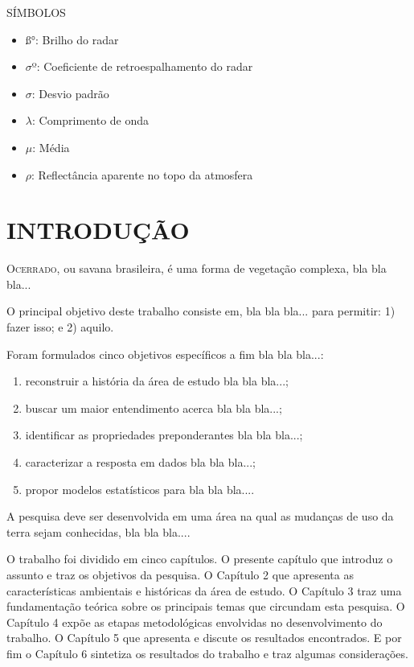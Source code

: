 \documentclass[
    oneside,
    a4paper,
    12pt
]{book}
\begin{document}
SÍMBOLOS
\begin{itemize}
    \item ß°: Brilho do radar
    \item {$\sigma$}º: Coeficiente de retroespalhamento do radar
    \item $\sigma$: Desvio padrão
    \item $\lambda$: Comprimento de onda
    \item $\mu$: Média
    \item {$\rho$}: Reflectância aparente no topo da atmosfera

\end{itemize}

\mainmatter    %
\chapter{INTRODUÇÃO}\lettrine{O}{cerrado}, ou savana brasileira, é uma forma de vegetação complexa, bla bla bla...

O principal objetivo deste trabalho consiste em,  bla bla bla... para permitir: 1) fazer isso; e 2) aquilo.

Foram formulados cinco objetivos específicos a fim  bla bla bla...:
\begin{enumerate}
    \item reconstruir a história da área de estudo  bla bla bla...;
    \item buscar um maior entendimento acerca  bla bla bla...;
    \item identificar as propriedades preponderantes  bla bla bla...;
    \item caracterizar a resposta em dados  bla bla bla...;
    \item propor modelos estatísticos para  bla bla bla....
\end{enumerate}

A pesquisa deve ser desenvolvida em uma área na qual as mudanças de uso da terra sejam conhecidas,  bla bla bla....

O trabalho foi dividido em cinco capítulos. O presente capítulo que introduz o assunto e traz os objetivos da pesquisa. O Capítulo 2 que apresenta as características ambientais e históricas da área de estudo. O Capítulo 3 traz uma fundamentação teórica sobre os principais temas que circundam esta pesquisa. O Capítulo 4 expõe as etapas metodológicas envolvidas no desenvolvimento do trabalho. O Capítulo 5 que apresenta e discute os resultados encontrados. E por fim o Capítulo 6 sintetiza os resultados do trabalho e traz algumas considerações.
\end{document}
